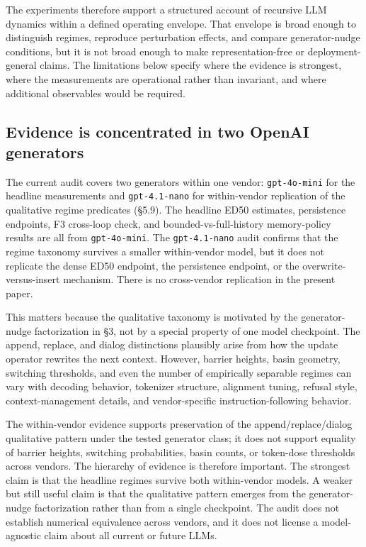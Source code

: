 \documentclass{article}
\theoremstyle{plain}
\theoremstyle{definition}
\begin{document}
The experiments therefore support a structured account of recursive LLM dynamics within a defined operating envelope. That envelope is broad enough to distinguish regimes, reproduce perturbation effects, and compare generator-nudge conditions, but it is not broad enough to make representation-free or deployment-general claims. The limitations below specify where the evidence is strongest, where the measurements are operational rather than invariant, and where additional observables would be required.

\subsection{Evidence is concentrated in two OpenAI generators}

The current audit covers two generators within one vendor: \texttt{gpt-4o-mini} for the headline measurements and \texttt{gpt-4.1-nano} for within-vendor replication of the qualitative regime predicates (§5.9). The headline ED50 estimates, persistence endpoints, F3 cross-loop check, and bounded-vs-full-history memory-policy results are all from \texttt{gpt-4o-mini}. The \texttt{gpt-4.1-nano} audit confirms that the regime taxonomy survives a smaller within-vendor model, but it does not replicate the dense ED50 endpoint, the persistence endpoint, or the overwrite-versus-insert mechanism. There is no cross-vendor replication in the present paper.

This matters because the qualitative taxonomy is motivated by the generator-nudge factorization in §3, not by a special property of one model checkpoint. The append, replace, and dialog distinctions plausibly arise from how the update operator rewrites the next context. However, barrier heights, basin geometry, switching thresholds, and even the number of empirically separable regimes can vary with decoding behavior, tokenizer structure, alignment tuning, refusal style, context-management details, and vendor-specific instruction-following behavior.

The within-vendor evidence supports preservation of the append/replace/dialog qualitative pattern under the tested generator class; it does not support equality of barrier heights, switching probabilities, basin counts, or token-dose thresholds across vendors. The hierarchy of evidence is therefore important. The strongest claim is that the headline regimes survive both within-vendor models. A weaker but still useful claim is that the qualitative pattern emerges from the generator-nudge factorization rather than from a single checkpoint. The audit does not establish numerical equivalence across vendors, and it does not license a model-agnostic claim about all current or future LLMs.
\end{document}
